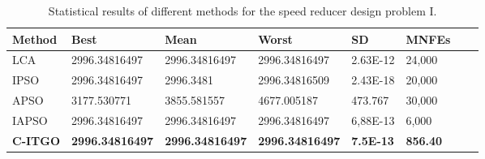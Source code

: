 
\begin{table*}[h]
    \tiny
    \begin{center}
    
    \begin{tabular}{ P{2.0cm} P{2.0cm} P{2.0cm} P{2.0cm} P{2.0cm} P{2.0cm} P{2.0cm} P{2.0cm}  }
    \hline
    \textbf{Method} & \textbf{Best} & \textbf{Mean} & \textbf{Worst} & \textbf{SD} & \textbf{MNFEs} \\
    \hline
    
    LCA & 2996.34816497 & 2996.34816497 & 2996.34816497 & 2.63E-12 & 24,000 \\
    IPSO & 2996.34816497 & 2996.3481 & 2996.34816509 & 2.43E-18 & 20,000 \\
    APSO & 3177.530771 & 3855.581557 & 4677.005187 & 473.767 & 30,000 \\  
    IAPSO & 2996.34816497 & 2996.34816497 & 2996.34816497 & 6,88E-13 & 6,000 \\
    \textbf{C-ITGO} & \bf{2996.34816497} & \bf{2996.34816497} & \bf{2996.34816497} & \bf{7.5E-13} & \bf{856.40} \\
        
    \hline
    \end{tabular}
    \end{center}
    \vspace*{-6mm}
    \caption{Statistical results of different methods for the speed reducer design problem I. \\[1em]}
    \label{tab:SP1}
    \end{table*}
    
    